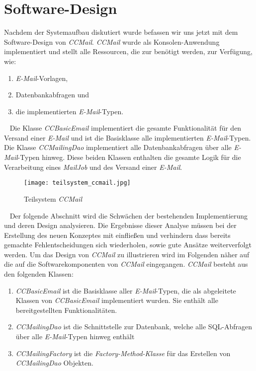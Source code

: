 \section{Software-Design}
\label{sec:ccmail-software-design}
Nachdem der Systemaufbau diskutiert wurde befassen wir uns jetzt mit dem Software-Design von \emph{CCMail}. \emph{CCMail} wurde als Konsolen-Anwendung implementiert und stellt alle Ressourcen, die zur benötigt werden, zur Verfügung, wie:
\begin{enumerate}
	\item \emph{E-Mail}-Vorlagen,
	\item Datenbankabfragen und
	\item die implementierten \emph{E-Mail}-Typen.
\end{enumerate}
\ \newline
Die Klasse \emph{CCBasicEmail} implementiert die gesamte Funktionalität für den Versand einer \emph{E-Mail} und ist die Basisklasse alle implementierten \emph{E-Mail}-Typen. Die Klasse \emph{CCMailingDao} implementiert alle Datenbankabfragen über alle \emph{E-Mail}-Typen hinweg. Diese beiden Klassen enthalten die gesamte Logik für die Verarbeitung eines \emph{MailJob} und des Versand einer \emph{E-Mail}.
\begin{figure}[h]
\centering
\texttt{[image: teilsystem\_ccmail.jpg]} 
\caption{Teilsystem \emph{CCMail}}
\label{fig:ccmail-teilsystem}
\end{figure}
\ \newline
Der folgende Abschnitt wird die Schwächen der bestehenden Implementierung und deren Design analysieren. Die Ergebnisse dieser Analyse müssen bei der Erstellung des neuen Konzeptes mit einfließen und verhindern dass bereits gemachte Fehlentscheidungen sich wiederholen, sowie gute Ansätze weiterverfolgt werden.
\newline
\newline
Um das Design von \emph{CCMail} zu illustrieren wird im Folgenden näher auf die auf die Softwarekomponenten von \emph{CCMail} eingegangen. \emph{CCMail} besteht aus den folgenden Klassen:
\begin{enumerate}
	\item\emph{CCBasicEmail} ist die Basisklasse aller \emph{E-Mail}-Typen, die als abgeleitete Klassen von \emph{CCBasicEmail} implementiert wurden. Sie enthält alle bereitgestellten Funktionalitäten.
	\item\emph{CCMailingDao} ist die Schnittstelle zur Datenbank, welche alle SQL-Abfragen über alle \emph{E-Mail}-Typen hinweg enthält
	\item\emph{CCMailingFactory} ist die \emph{Factory-Method-Klasse} für das Erstellen von \emph{CCMailingDao} Objekten.
\end{enumerate}
\newpage

